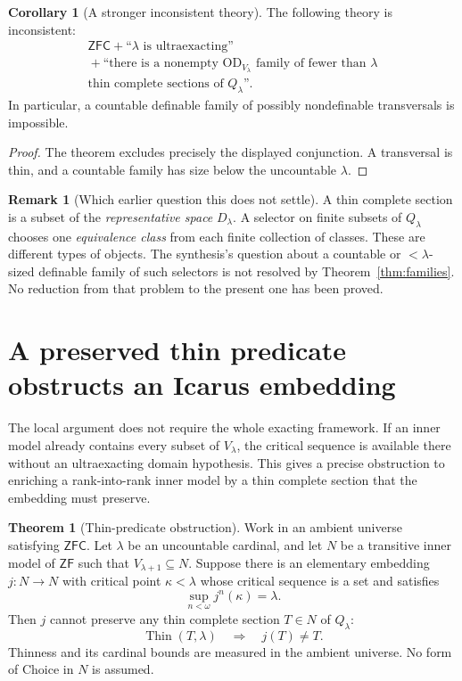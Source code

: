 \documentclass[11pt,letterpaper]{article}
\theoremstyle{definition}
\newtheorem{theorem}[definition]{Theorem}
\newtheorem{corollary}[definition]{Corollary}
\newcommand{\ZFC}{\mathsf{ZFC}}
\newcommand{\ZF}{\mathsf{ZF}}
\newcommand{\OD}{\mathrm{OD}}
\newtheorem{remark}[definition]{Remark}
\numberwithin{equation}{section}
\newcommand{\Thin}{\operatorname{Thin}}
\begin{document}
\begin{corollary}[A stronger inconsistent theory]\label{cor:family-inconsistency}
The following theory is inconsistent:
\[
\begin{gathered}
 \ZFC+\text{``$\lambda$ is ultraexacting''}\\
 {}+\text{``there is a nonempty $\OD_{V_\lambda}$ family of fewer than $\lambda$}\\
 \text{thin complete sections of $Q_\lambda$''.}
\end{gathered}
\]
In particular, a countable definable family of possibly nondefinable
transversals is impossible.
\end{corollary}

\begin{proof}
The theorem excludes precisely the displayed conjunction. A transversal is
thin, and a countable family has size below the uncountable $\lambda$.
\end{proof}

\begin{remark}[Which earlier question this does not settle]\label{rem:selector-distinction}
A thin complete section is a subset of the \emph{representative space}
$D_\lambda$. A selector on finite subsets of $Q_\lambda$ chooses one
\emph{equivalence class} from each finite collection of classes. These are
different types of objects. The synthesis's question about a countable or
$<\lambda$-sized definable family of such selectors is not resolved by
Theorem~\ref{thm:families}. No reduction from that problem to the present one
has been proved.
\end{remark}

\section{A preserved thin predicate obstructs an Icarus embedding}\label{sec:icarus}

The local argument does not require the whole exacting framework. If an inner
model already contains every subset of $V_\lambda$, the critical sequence is
available there without an ultraexacting domain hypothesis. This gives a
precise obstruction to enriching a rank-into-rank inner model by a thin
complete section that the embedding must preserve.

\begin{theorem}[Thin-predicate obstruction]\label{thm:icarus}
Work in an ambient universe satisfying $\ZFC$. Let $\lambda$ be an uncountable cardinal, and let $N$ be a transitive inner
model of $\ZF$ such that $V_{\lambda+1}\subseteq N$. Suppose there is an
elementary embedding $j:N\to N$ with critical point $\kappa<\lambda$ whose
critical sequence is a set and satisfies
\[
                \sup_{n<\omega}j^n(\kappa)=\lambda.
\]
Then $j$ cannot preserve any thin complete section $T\in N$ of $Q_\lambda$:
\[
                     \Thin(T,\lambda)\quad\Longrightarrow\quad j(T)\ne T.
\]
Thinness and its cardinal bounds are measured in the ambient universe.
No form of Choice in $N$ is assumed.
\end{theorem}
\end{document}
